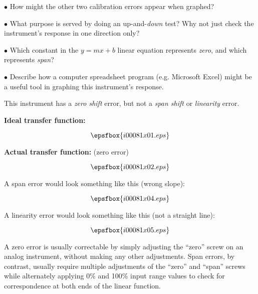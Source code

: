 \medskip
\item{$\bullet$} How might the other two calibration errors appear when graphed?
\item{$\bullet$} What purpose is served by doing an up-and-{\it down} test?  Why not just check the instrument's response in one direction only?
\item{$\bullet$} Which constant in the $y = mx + b$ linear equation represents {\it zero}, and which represents {\it span}?
\item{$\bullet$} Describe how a computer spreadsheet program (e.g. Microsoft Excel) might be a useful tool in graphing this instrument's response.
\medskip







This instrument has a {\it zero shift} error, but not a {\it span shift} or {\it linearity} error.

\vskip 10pt

\noindent
{\bf Ideal transfer function:}

$$\epsfbox{i00081x01.eps}$$

\vskip 10pt

\noindent
{\bf Actual transfer function:} (zero error)

$$\epsfbox{i00081x02.eps}$$

\vskip 10pt

\filbreak

\noindent
A span error would look something like this (wrong slope):

$$\epsfbox{i00081x04.eps}$$

\vskip 10pt

\noindent
A linearity error would look something like this (not a straight line):

$$\epsfbox{i00081x05.eps}$$

\vskip 10pt

A zero error is usually correctable by simply adjusting the ``zero'' screw on an analog instrument, without making any other adjustments.  Span errors, by contrast, usually require multiple adjustments of the ``zero'' and ``span'' screws while alternately applying 0\% and 100\% input range values to check for correspondence at both ends of the linear function.






